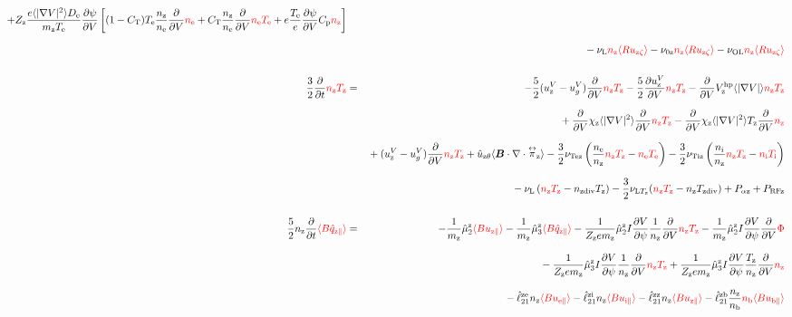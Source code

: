 \documentclass[11pt]{article}
\def\bvec#1{\leavevmode\hbox{\boldmath$#1$}}
\let\vec=\bvec
\def\r#1{{\rm#1}}
\def\aves#1{\langle#1\rangle}
\def\dd#1#2{\frac{\partial #1}{\partial #2}}
\def\tensor#1{\mathord{\displaystyle\mathop{#1}^\leftrightarrow}}
\def\para{\parallel}
\def\ddV{\frac{\partial}{\partial V}}
\def\ddt{\frac{\partial}{\partial t}}
\def\mz{m_\r{z}}
\def\nee{n_\r{e}}
\def\ni{n_\r{i}}
\def\nz{n_\r{z}}
\def\nb{n_\r{b}}
\def\Te{T_\r{e}}
\def\Ti{T_\r{i}}
\def\Tz{T_\r{z}}
\def\Zz{Z_\r{z}}
\def\uzt#1{u_{\r{#1}\zeta}}
\def\upara#1{u_{\r{#1}\para}}
\def\uhatth#1{\hat{u}_{\r{#1}\theta}}
\def\qhatpara#1{\hat{q}_{\r{#1}\para}}
\def\uV#1{u_\r{#1}^V}
\def\ugV{u_{g}^V}
\def\chis#1{\chi_\r{#1}}
\def\De{D_\r{e}}
\def\nun#1{\nu_\r{0#1}}
\def\ndiv#1{n_\r{#1div}}
\def\Tdiv#1{T_\r{#1div}}
\def\nuLT#1{\nu_{\r{L}T_\r{#1}}}
\def\PRF#1{P_\r{RF#1}}
\def\Palp#1{P_{\alpha\r{#1}}}
\def\nuL{\nu_\r{L}}
\def\nuOL{\nu_\r{OL}}
\def\red#1{\textcolor{red}{#1}}
\begin{document}
\begin{eqnarray}
%
%
  + \Zz \frac{e \aves{|\nabla V|^2} \De}{\mz\Te} \dd{\psi}{V} 
%
    \left[  (1-C_\r{T})\Te \frac{\nz}{\nee} \ddV \red{\nee}
           + C_\r{T} \frac{\nz}{\nee} \ddV \red{\nee\Te}
	  + e \frac{\Te}{e} \dd{\psi}{V} C_\r{p} \red{\nz} \right]
\nonumber\\[2.5mm]&&{}
%
  - \nuL  \red{\nz \aves{R \uzt{z}}}
%
  - \nun{z} \red{\nz \aves{R \uzt{z}}}
%
  - \nuOL \red{\nz \aves{R \uzt{z}}}
\\[5mm]
  \frac{3}{2} \ddt \red{\nz \Tz}  &=& 
%
  - \frac{5}{2} ( \uV{z} - \ugV ) \ddV \red{\nz \Tz}
%
  - \frac{5}{2} \dd{\uV{z}}{V} \red{\nz \Tz}
%
  - \ddV V_\r{z}^\r{hp} \aves{|\nabla V|} \red{\nz \Tz}
\nonumber\\[2.5mm]&&{}
  + \ddV \chis{z} \aves{|\nabla V|^2} \ddV \red{\nz \Tz}
  - \ddV \chis{z} \aves{|\nabla V|^2} \Tz \ddV \red{\nz}
\nonumber\\[2.5mm]&&{}
%
  + ( \uV{z} - \ugV ) \ddV \red{\nz \Tz}
%
  + \uhatth{z} \aves{\vec{B}\cdot\nabla\cdot\tensor{\pi}_\r{z}}
%
  - \frac{3}{2} \nu_\r{Tez} \left(\frac{\nee}{\nz} \red{\nz \Tz} - \red{\nee \Te} \right)
  - \frac{3}{2} \nu_\r{Tiz} \left(\frac{\ni }{\nz} \red{\nz \Tz} - \red{\ni  \Ti} \right)
\nonumber\\[2.5mm]&&{}
%
  - \nuL \left(\red{\nz \Tz}  - \ndiv{z} \Tz \right)
%
  - \frac{3}{2} \nuLT{z} (\red{\nz \Tz} - \nz \Tdiv{z})
%
  + \Palp{z}
%
  + \PRF{z}
\\[5mm]
 \frac{5}{2} \nz \ddt \red{\aves{B \qhatpara{z}}} &=&
%
  - \frac{1}{\mz} \hat{\mu}_2^\r{z} \red{\aves{B \upara{z}}}
  - \frac{1}{\mz} \hat{\mu}_3^\r{z} \red{\aves{B \qhatpara{z}}}
%
  - \frac{1}{\Zz e\mz} \hat{\mu}_2^\r{z} I \dd{V}{\psi} \frac{1}{\nz}
  \ddV \red{\nz\Tz}
  - \frac{1}{\mz} \hat{\mu}_2^\r{z} I \dd{V}{\psi} \ddV \red{\Phi}
\nonumber\\[3mm]&&{}
%
  - \frac{1}{\Zz e\mz} \hat{\mu}_3^\r{z} I \dd{V}{\psi} \frac{1}{\nz}
  \ddV \red{\nz\Tz}
  + \frac{1}{\Zz e\mz} \hat{\mu}_3^\r{z} I \dd{V}{\psi} \frac{\Tz}{\nz}
  \ddV \red{\nz}
\nonumber\\[3mm]&&{}
%
  - \hat{\ell}_{21}^{\r{ze}} \nz \red{\aves{B \upara{e}}} 
  - \hat{\ell}_{21}^{\r{zi}} \nz \red{\aves{B \upara{i}}} 
  - \hat{\ell}_{21}^{\r{zz}} \nz \red{\aves{B \upara{z}}} 
  - \hat{\ell}_{21}^{\r{zb}} \frac{\nz}{\nb} \red{\nb \aves{B \upara{b}}} 

\end{eqnarray}
\end{document}
